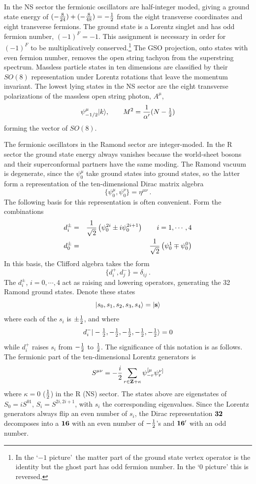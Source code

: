 \documentclass[12pt]{article}
\def\be{\begin{equation}}
\def\ee{\end{equation}}
\def\bea{\begin{eqnarray}}
\def\eea{\end{eqnarray}}
\def\ha{{\textstyle{1\over 2}}}
\begin{document}
In the NS sector the fermionic
oscillators are half-integer moded, giving a ground state energy of
$
(-{{8}\over{24}})+(-{{8}\over{48}})
 = - {1\over 2}
$
from the eight transverse coordinates and eight transverse
fermions.  The ground state is a
Lorentz singlet and has odd 
fermion number, $(-1)^F = -1$.  This assignment is necessary in order for
$(-1)^F$ to be multiplicatively conserved.\footnote{In the `$-1$
picture'\, \cite{fms}
the matter part of the ground state vertex operator is the
identity but the ghost part has odd fermion number.  In the `0 picture' this
is reversed.\label{picfoot}} The GSO projection, onto states with even fermion
number, removes the open string tachyon from the superstring spectrum. 
Massless particle states in ten dimensions are classified by their $SO(8)$
representation under Lorentz rotations that leave the momentum invariant. 
The lowest lying states in the NS sector are the eight transverse
polarizations of the massless open string photon, $A^{\mu}$, 
\be
\psi^{\mu}_{-1/2} |{ k}\rangle, \qquad M^2={{1}\over{\alpha'}} (N - \ha)
\ee
forming the vector of $SO(8)$. 

The fermionic oscillators in the Ramond sector are integer-moded.
In the R sector the ground state energy always vanishes
because the world-sheet bosons and their superconformal partners have the
same moding.
The Ramond vacuum is degenerate, since the $\psi^{\mu}_0$ take ground 
states into ground states, so the latter form a representation of the 
ten-dimensional Dirac matrix algebra  
\be
\{ \psi^{\mu}_0 , \psi^{\nu}_0 \} = \eta^{\mu \nu}\ .
\ee
The following basis for this representation is often convenient.  Form
the combinations
\bea
d^{\pm}_i &=& {{1}\over{\sqrt 2}}\left ( \psi^{2i}_0\pm i \psi^{2i+1}_0\right
) \qquad i=1,\cdots,4 \nonumber\\ 
 d^{\pm}_0 &=& {{1}\over{\sqrt 2}}\left ( \psi^{1}_0 \mp \psi^{0}_0\right ) 
\eea
In this basis, the Clifford algebra takes the form
\be
\{ d^{+}_i, d^{-}_j \}=\delta_{ij}\ .
\ee
The $d^{\pm}_i$, $i = 0, \cdots, 4$ act as raising and lowering 
operators, generating the 32 Ramond ground states.  Denote these
states
\be
|s_0,s_1,s_2,s_3,s_4 \rangle = |{\bf s}\rangle
\ee
where each of the $s_i$ is $\pm\ha$, and where
\be
d^{-}_{i} | -\ha , -\ha , -\ha , -\ha , -\ha \rangle = 0  
\ee
while $d^{+}_i$ raises $s_i$ from $-\ha$ to $\ha$.
The significance of this notation is as follows.  The fermionic part of the
ten-dimensional Lorentz generators is 
\be
S^{\mu \nu} = - {{i}\over{2}} \sum_{r \in {\bf Z }+\kappa} 
  \psi^{[ \mu}_{-r}\psi^{\nu ]}_r  
\ee
where $\kappa=0$ ($\ha$) in the R (NS) sector.  The states above are
eigenstates of $S_0 = iS^{01}$, $S_i = S^{2i,2i+1}$, with $s_i$ the
corresponding eigenvalues.  Since the Lorentz generators always flip an
even number of $s_i$, the Dirac representation $\bf 32$ decomposes into a
$\bf 16$ with an even number of $-\ha$'s and $\bf 16'$ with an odd number.
\end{document}
